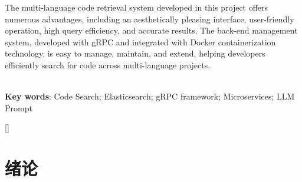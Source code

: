 \documentclass[UTF8,a4paper,12pt]{ctexart}
\numberwithin{equation}{section}
\renewcommand\thesection{\arabic{section}}
\begin{document}
The multi-language code retrieval system developed in this project offers numerous advantages, including an aesthetically pleasing interface, user-friendly operation, high query efficiency, and accurate results. The back-end management system, developed with gRPC and integrated with Docker containerization technology, is easy to manage, maintain, and extend, helping developers efficiently search for code across multi-language projects.\par
~\\ 
\hspace*{2em}\textbf{Key words}: Code Search; Elasticsearch; gRPC framework; Microservices; LLM Prompt\\

\newpage
{}

\renewcommand\contentsname{{目\quad 录}}

\begin{center}
{\tableofcontents
\thispagestyle{fancy}
}
\end{center}



\newpage
{}


\titleformat{\section}{\heiti\zihao{3}\centering}{\thesection}{0.5em}{}[]
\section{绪论}
\end{document}
